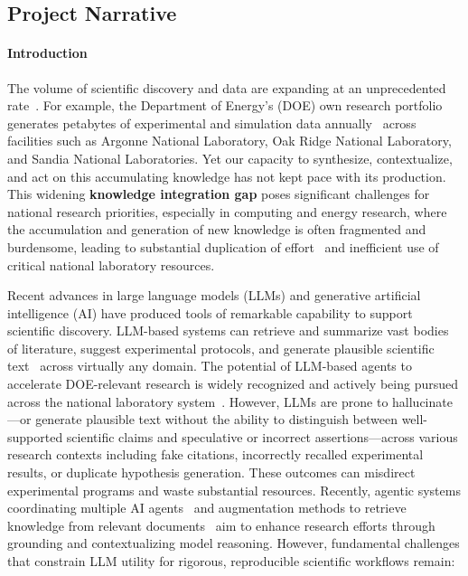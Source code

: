 \documentclass{files/proposalnsf}
\begin{document}
\subsection*{Project Narrative}

\paragraph*{Introduction}
The volume of scientific discovery and data are expanding at an unprecedented rate~\cite{}. For example, the Department of Energy's (DOE) own research portfolio generates petabytes of experimental and simulation data annually~\cite{} across facilities such as Argonne National Laboratory, Oak Ridge National Laboratory, and Sandia National Laboratories. Yet our capacity to synthesize, contextualize, and act on this accumulating knowledge has not kept pace with its production. This widening \textbf{knowledge integration gap} poses significant challenges for national research priorities, especially in computing and energy research, where the accumulation and generation of new knowledge is often fragmented and burdensome, leading to substantial duplication of effort~\cite{} and inefficient use of critical national laboratory resources. 

Recent advances in large language models (LLMs) and generative artificial intelligence (AI) have produced tools of remarkable capability to support scientific discovery. LLM-based systems can retrieve and summarize vast bodies of literature, suggest experimental protocols, and generate plausible scientific text~\cite{huang2023role} across virtually any domain.  The potential of LLM-based agents to accelerate DOE-relevant research is widely recognized and actively being pursued across the national laboratory system~\cite{rummler2026sandians}. However, LLMs are prone to hallucinate---or generate plausible text without the ability to distinguish between well-supported scientific claims and speculative or incorrect assertions---across various research contexts including fake citations, incorrectly recalled experimental results, or duplicate hypothesis generation. These outcomes can misdirect experimental programs and waste substantial resources. Recently, agentic systems coordinating multiple AI agents~\cite{} and augmentation methods to retrieve knowledge from relevant documents~\cite{} aim to enhance research efforts through grounding and contextualizing model reasoning. However, fundamental challenges that constrain LLM utility for rigorous, reproducible scientific workflows remain:
\end{document}
